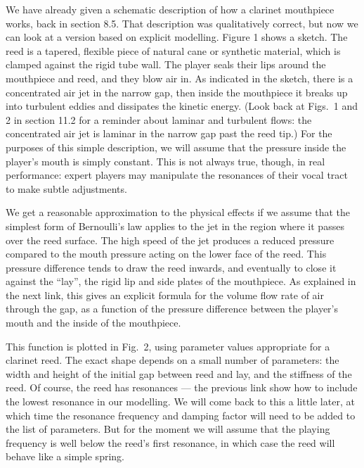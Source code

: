   We have already given a schematic description of how a clarinet mouthpiece 
  works, back in section 8.5. That description was qualitatively correct, but 
  now we can look at a version based on explicit modelling. Figure 1 shows a 
  sketch. The reed is a tapered, flexible piece of natural cane or synthetic 
  material, which is clamped against the rigid tube wall. The player seals 
  their lips around the mouthpiece and reed, and they blow air in. As indicated 
  in the sketch, there is a concentrated air jet in the narrow gap, then inside 
  the mouthpiece it breaks up into turbulent eddies and dissipates the kinetic 
  energy. (Look back at Figs.\ 1 and 2 in section 11.2 for a reminder about 
  laminar and turbulent flows: the concentrated air jet is laminar in the 
  narrow gap past the reed tip.) For the purposes of this simple description, 
  we will assume that the pressure inside the player's mouth is simply 
  constant. This is not always true, though, in real performance: expert 
  players may manipulate the resonances of their vocal tract to make subtle 
  adjustments. 

  We get a reasonable approximation to the physical effects if we assume that 
  the simplest form of Bernoulli’s law applies to the jet in the region where 
  it passes over the reed surface. The high speed of the jet produces a reduced 
  pressure compared to the mouth pressure acting on the lower face of the reed. 
  This pressure difference tends to draw the reed inwards, and eventually to 
  close it against the “lay”, the rigid lip and side plates of the mouthpiece. 
  As explained in the next link, this gives an explicit formula for the volume 
  flow rate of air through the gap, as a function of the pressure difference 
  between the player’s mouth and the inside of the mouthpiece. 

  This function is plotted in Fig.\ 2, using parameter values appropriate for a 
  clarinet reed. The exact shape depends on a small number of parameters: the 
  width and height of the initial gap between reed and lay, and the stiffness 
  of the reed. Of course, the reed has resonances — the previous link show how 
  to include the lowest resonance in our modelling. We will come back to this a 
  little later, at which time the resonance frequency and damping factor will 
  need to be added to the list of parameters. But for the moment we will assume 
  that the playing frequency is well below the reed’s first resonance, in which 
  case the reed will behave like a simple spring. 

